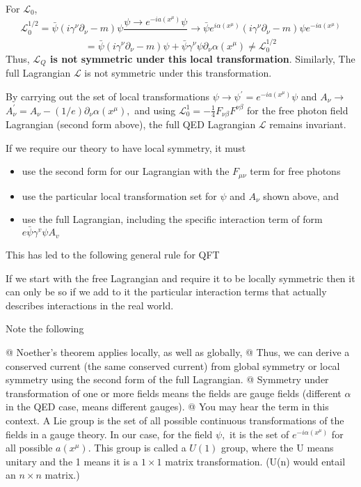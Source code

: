 For $\mathcal{L_0}$,
$$
\mathcal{L}_{0}^{1 / 2}=\bar{\psi}\left(i \gamma^{\nu} \partial_{\nu}-m\right) \psi \frac{\psi \rightarrow e^{-i a\left(x^{\mu}\right)} \psi}{ }\rightarrow \bar{\psi} e^{i \alpha\left(x^{\mu}\right)}\left(i \gamma^{\nu} \partial_{\nu}-m\right) \psi e^{-i a\left(x^{\mu}\right)}
$$
$$
=\bar{\psi}\left(i \gamma^{\nu} \partial_{\nu}-m\right) \psi+\bar{\psi} \gamma^{\nu} \psi \partial_{\nu} \alpha\left(x^{\mu}\right)\neq \mathcal{L}_0^{1/2}
$$
Thus, \textbf{$\mathcal{L}_{Q}$ is not symmetric under this local transformation}. Similarly, The full Lagrangian $\mathcal{L}$ is not symmetric under this transformation.
\begin{qt}
    By carrying out the set of local transformations $\psi \rightarrow \psi^{\prime}=e^{-i a\left(x^{\mu}\right)} \psi$ and $A_{\nu} \rightarrow$ $A^{\prime}_{\nu}=A_{\nu}-(1 / e) \partial_{\nu} \alpha\left(x^{\mu}\right),$ and using $\mathcal{L}_{0}^{1}=-\frac{1}{4} F_{\nu \beta} F^{\nu \beta}$ for the free photon field Lagrangian (second form above), the full QED Lagrangian $\mathcal{L}$ remains invariant.
\end{qt}
If we require our theory to have local symmetry, it must
\begin{itemize}
    \item use the second form for our Lagrangian with the $F_{\mu\nu}$ term for free photons
\item  use the particular local transformation set for $\psi$ and $A_{\nu}$ shown above, and
\item use the full Lagrangian, including the specific interaction term of form $e \bar{\psi} \gamma^{v} \psi A_{v}$
\end{itemize}
This has led to the following general rule for QFT
\begin{qt}
    If we start with the free Lagrangian and require it to be locally symmetric then it can only be so if we add to it the particular interaction terms that actually describes interactions in the real world.
\end{qt}
Note the following
\begin{qt}
    \begin{easylist}
    \NewList
    @ Noether's theorem applies locally, as well as globally,
    @ Thus, we can derive a conserved current (the same conserved current) from global symmetry or local symmetry using the second form of the full Lagrangian.
    @ Symmetry under transformation of one or more fields means the fields are gauge fields (different $\alpha$ in the QED case, means different gauges).
    @ You may hear the term  in this context. A Lie group is the set of all possible continuous transformations of the fields in a gauge theory. In our case, for the field $\psi,$ it is the set of $e^{-i \alpha\left(x^{\mu}\right)}$ for all possible $a\left(x^{\mu}\right) .$ This group is called a $U(1)$ group, where the U means unitary and the 1 means it is a $1\times 1$ matrix transformation. (U(n) would entail an $n\times n$ matrix.)
    \end{easylist}
\end{qt}
